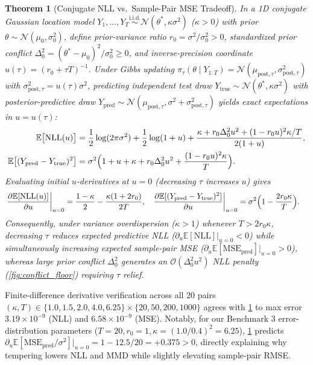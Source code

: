 \documentclass[11pt,a4paper,reqno]{amsart}
\newtheorem{theorem}{Theorem}[section]
\theoremstyle{definition}
\theoremstyle{remark}
\newcommand{\E}{\mathbb{E}}
\newcommand{\Ncal}{\mathcal{N}}
\begin{document}
\begin{theorem}[Conjugate NLL vs.\ Sample-Pair MSE Tradeoff]\label{thm:conflict_floor}
In a 1D conjugate Gaussian location model $Y_1, \dots, Y_T \stackrel{\mathrm{i.i.d.}}{\sim} \Ncal(\theta^*, \kappa\sigma^2)$ ($\kappa > 0$) with prior $\theta \sim \Ncal(\mu_0, \sigma_0^2)$, define prior-variance ratio $r_0 = \sigma^2 / \sigma_0^2 > 0$, standardized prior conflict $\Delta_0^2 = (\theta^* - \mu_0)^2 / \sigma_0^2 \ge 0$, and inverse-precision coordinate $u(\tau) = (r_0 + \tau T)^{-1}$. Under Gibbs updating $\pi_\tau(\theta \mid Y_{1:T}) = \Ncal(\mu_{\mathrm{post},\tau}, \sigma_{\mathrm{post},\tau}^2)$ with $\sigma_{\mathrm{post},\tau}^2 = u(\tau)\sigma^2$, predicting independent test draw $Y_{\mathrm{true}} \sim \Ncal(\theta^*, \kappa\sigma^2)$ with posterior-predictive draw $Y_{\mathrm{pred}} \sim \Ncal(\mu_{\mathrm{post},\tau}, \sigma^2 + \sigma_{\mathrm{post},\tau}^2)$ yields exact expectations in $u = u(\tau)$:
\begin{align}
\E\bigl[\mathrm{NLL}(u)\bigr] &= \frac{1}{2}\log(2\pi\sigma^2) + \frac{1}{2}\log(1 + u) + \frac{\kappa + r_0 \Delta_0^2 u^2 + (1 - r_0 u)^2 \kappa / T}{2(1 + u)}, \label{eq:exact_nll_1d}\\
\E\bigl[(Y_{\mathrm{pred}} - Y_{\mathrm{true}})^2\bigr] &= \sigma^2\Bigl(1 + u + \kappa + r_0 \Delta_0^2 u^2 + \frac{(1 - r_0 u)^2 \kappa}{T}\Bigr). \label{eq:exact_mse_1d}
\end{align}
Evaluating initial $u$-derivatives at $u = 0$ (decreasing $\tau$ increases $u$) gives
\begin{align*}
\left.\frac{\partial \E[\mathrm{NLL}(u)]}{\partial u}\right|_{u=0} &= \frac{1 - \kappa}{2} - \frac{\kappa(1 + 2 r_0)}{2 T}, &
\left.\frac{\partial \E[(Y_{\mathrm{pred}} - Y_{\mathrm{true}})^2]}{\partial u}\right|_{u=0} &= \sigma^2\Bigl(1 - \frac{2 r_0 \kappa}{T}\Bigr).
\end{align*}
Consequently, under variance overdispersion ($\kappa > 1$) whenever $T > 2 r_0 \kappa$, decreasing $\tau$ reduces expected predictive NLL ($\partial_u \E[\mathrm{NLL}]|_{u=0} < 0$) while simultaneously increasing expected sample-pair MSE ($\partial_u \E[\mathrm{MSE}_{\mathrm{pred}}]|_{u=0} > 0$), whereas large prior conflict $\Delta_0^2$ generates an $\mathcal{O}(\Delta_0^2 u^2)$ NLL penalty (\cref{fig:conflict_floor}) requiring $\tau$ relief.
\end{theorem}

Finite-difference derivative verification across all 20 pairs $(\kappa, T) \in \{1.0, 1.5, 2.0, 4.0, 6.25\} \times \{20, 50, 200, 1000\}$ agrees with \cref{thm:conflict_floor} to max error $3.19 \times 10^{-9}$ (NLL) and $6.58 \times 10^{-9}$ (MSE). Notably, for our Benchmark 3 error-distribution parameters ($T=20, r_0=1, \kappa=(1.0/0.4)^2=6.25$), \cref{thm:conflict_floor} predicts $\partial_u \E[\mathrm{MSE}_{\mathrm{pred}}/\sigma^2]|_{u=0} = 1 - 12.5/20 = +0.375 > 0$, directly explaining why tempering lowers NLL and MMD while slightly elevating sample-pair RMSE.
\end{document}
